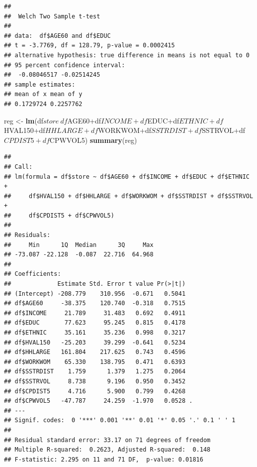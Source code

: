 \documentclass[]{article}
\newenvironment{Shaded}{\begin{snugshade}}{\end{snugshade}}
\newcommand{\KeywordTok}[1]{\textcolor[rgb]{0.13,0.29,0.53}{\textbf{{#1}}}}
\newcommand{\StringTok}[1]{\textcolor[rgb]{0.31,0.60,0.02}{{#1}}}
\newcommand{\NormalTok}[1]{{#1}}
\begin{document}
\begin{verbatim}
## 
##  Welch Two Sample t-test
## 
## data:  df$AGE60 and df$EDUC
## t = -3.7769, df = 128.79, p-value = 0.0002415
## alternative hypothesis: true difference in means is not equal to 0
## 95 percent confidence interval:
##  -0.08046517 -0.02514245
## sample estimates:
## mean of x mean of y 
## 0.1729724 0.2257762
\end{verbatim}

\begin{Shaded}
\begin{Highlighting}[]
\NormalTok{reg <-}\StringTok{ }\KeywordTok{lm}\NormalTok{(df$store~df$AGE60+df$INCOME+df$EDUC+df$ETHNIC+df$HVAL150+df$HHLARGE+df$WORKWOM+df$SSTRDIST+df$SSTRVOL+df$CPDIST5+df$CPWVOL5)}
\KeywordTok{summary}\NormalTok{(reg)}
\end{Highlighting}
\end{Shaded}

\begin{verbatim}
## 
## Call:
## lm(formula = df$store ~ df$AGE60 + df$INCOME + df$EDUC + df$ETHNIC + 
##     df$HVAL150 + df$HHLARGE + df$WORKWOM + df$SSTRDIST + df$SSTRVOL + 
##     df$CPDIST5 + df$CPWVOL5)
## 
## Residuals:
##     Min      1Q  Median      3Q     Max 
## -73.087 -22.128  -0.087  22.716  64.968 
## 
## Coefficients:
##             Estimate Std. Error t value Pr(>|t|)  
## (Intercept) -208.779    310.956  -0.671   0.5041  
## df$AGE60     -38.375    120.740  -0.318   0.7515  
## df$INCOME     21.789     31.483   0.692   0.4911  
## df$EDUC       77.623     95.245   0.815   0.4178  
## df$ETHNIC     35.161     35.236   0.998   0.3217  
## df$HVAL150   -25.203     39.299  -0.641   0.5234  
## df$HHLARGE   161.804    217.625   0.743   0.4596  
## df$WORKWOM    65.330    138.795   0.471   0.6393  
## df$SSTRDIST    1.759      1.379   1.275   0.2064  
## df$SSTRVOL     8.738      9.196   0.950   0.3452  
## df$CPDIST5     4.716      5.900   0.799   0.4268  
## df$CPWVOL5   -47.787     24.259  -1.970   0.0528 .
## ---
## Signif. codes:  0 '***' 0.001 '**' 0.01 '*' 0.05 '.' 0.1 ' ' 1
## 
## Residual standard error: 33.17 on 71 degrees of freedom
## Multiple R-squared:  0.2623, Adjusted R-squared:  0.148 
## F-statistic: 2.295 on 11 and 71 DF,  p-value: 0.01816
\end{verbatim}
\end{document}
